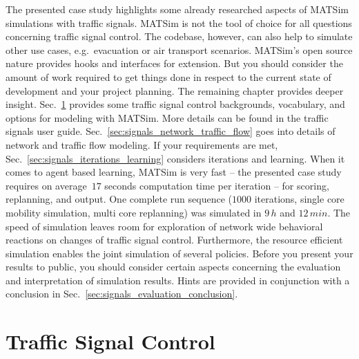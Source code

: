 The presented case study highlights some already researched aspects of MATSim simulations with traffic signals. 
MATSim is not the tool of choice for all questions concerning traffic signal control. 
The codebase, however, can also help to simulate other use cases, e.g.~evacuation or air transport scenarios. 
MATSim's open source nature provides hooks and interfaces for extension. 
But you should consider the amount of work required to get things done in respect to the current state of development and your project planning. 
The remaining chapter provides deeper insight.  
Sec.~\ref{sec:signals_traffic_signal_control} provides some traffic signal control backgrounds, vocabulary, and options for modeling with MATSim. More details can be found in the traffic signals user guide.  
Sec.~\ref{sec:signals_network_traffic_flow} goes into details of network and traffic flow modeling. 
If your requirements are met, Sec.~\ref{sec:signals_iterations_learning} considers iterations and learning. 
When it comes to agent based learning, MATSim is very fast -- the presented case study requires on average~$17$ seconds computation time per iteration -- for scoring, replanning, and output. One complete run sequence ($1000$ iterations, single core mobility simulation, multi core replanning) was simulated in $9 \, h$ and $12 \, min$. 
The speed of simulation leaves room for exploration of network wide behavioral reactions on changes of traffic signal control. 
Furthermore, the resource efficient simulation enables the joint simulation of several policies. 
Before you present your results to public, you should consider certain aspects concerning the  evaluation and interpretation of simulation results. 
Hints are provided in conjunction with a conclusion in Sec.~\ref{sec:signals_evaluation_conclusion}. 


\section{Traffic Signal Control}
\label{sec:signals_traffic_signal_control}

